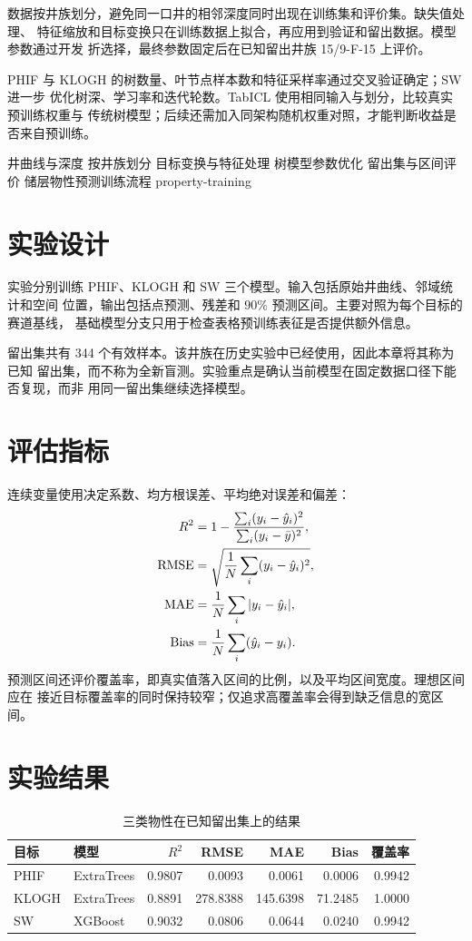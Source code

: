 数据按井族划分，避免同一口井的相邻深度同时出现在训练集和评价集。缺失值处理、
特征缩放和目标变换只在训练数据上拟合，再应用到验证和留出数据。模型参数通过开发
折选择，最终参数固定后在已知留出井族 15/9-F-15 上评价。

PHIF 与 KLOGH 的树数量、叶节点样本数和特征采样率通过交叉验证确定；SW 进一步
优化树深、学习率和迭代轮数。TabICL 使用相同输入与划分，比较真实预训练权重与
传统树模型；后续还需加入同架构随机权重对照，才能判断收益是否来自预训练。

\TrainingFlow
  {井曲线与深度}
  {按井族划分}
  {目标变换与特征处理}
  {树模型参数优化}
  {留出集与区间评价}
  {储层物性预测训练流程}
  {property-training}

\section{实验设计}

实验分别训练 PHIF、KLOGH 和 SW 三个模型。输入包括原始井曲线、邻域统计和空间
位置，输出包括点预测、残差和 $90\%$ 预测区间。主要对照为每个目标的赛道基线，
基础模型分支只用于检查表格预训练表征是否提供额外信息。

留出集共有 344 个有效样本。该井族在历史实验中已经使用，因此本章将其称为已知
留出集，而不称为全新盲测。实验重点是确认当前模型在固定数据口径下能否复现，而非
用同一留出集继续选择模型。

\section{评估指标}

连续变量使用决定系数、均方根误差、平均绝对误差和偏差：
\begin{align}
  R^2 &= 1-\frac{\sum_i(y_i-\hat{y}_i)^2}
  {\sum_i(y_i-\bar{y})^2},\\
  \mathrm{RMSE} &= \sqrt{\frac{1}{N}\sum_i(y_i-\hat{y}_i)^2},\\
  \mathrm{MAE} &= \frac{1}{N}\sum_i|y_i-\hat{y}_i|,\\
  \mathrm{Bias} &= \frac{1}{N}\sum_i(\hat{y}_i-y_i).
\end{align}
预测区间还评价覆盖率，即真实值落入区间的比例，以及平均区间宽度。理想区间应在
接近目标覆盖率的同时保持较窄；仅追求高覆盖率会得到缺乏信息的宽区间。

\section{实验结果}

\begin{table}[htbp]
  \centering
  \caption{三类物性在已知留出集上的结果}
  \label{tab:property-holdout}
  \begin{tabular}{llrrrrr}
    \toprule
    目标 & 模型 & $R^2$ & RMSE & MAE & Bias & 覆盖率 \\
    \midrule
    PHIF & ExtraTrees & 0.9807 & 0.0093 & 0.0061 & 0.0006 & 0.9942 \\
    KLOGH & ExtraTrees & 0.8891 & 278.8388 & 145.6398 & 71.2485 & 1.0000 \\
    SW & XGBoost & 0.9032 & 0.0806 & 0.0644 & 0.0240 & 0.9942 \\
    \bottomrule
  \end{tabular}
\end{table}

